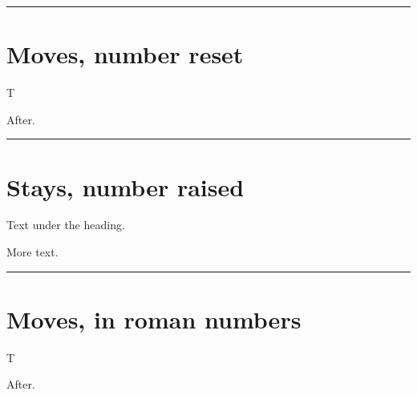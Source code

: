 \documentclass[a4paper]{article}
\newcommand\roomfor[1]{%
  \clearpage
  \noindent\rule{\linewidth}{0.4pt}\par
  \vspace*{\dimexpr\textheight-\topskip-#1\baselineskip-\baselineskip\relax}%
  \par}
\begin{document}
\setcounter{page}{7}
\roomfor{8}
\section{Moves, number reset}
\setcounter{page}{1}
\noindent\parbox{\linewidth}{\rule{0pt}{10\baselineskip}T}\par
After.

\roomfor{30}
\section{Stays, number raised}
\setcounter{page}{50}
Text under the heading.

More text.

\clearpage{}
\roomfor{8}
\section{Moves, in roman numbers}
\noindent\parbox{\linewidth}{\rule{0pt}{10\baselineskip}T}\par
After.
\end{document}
